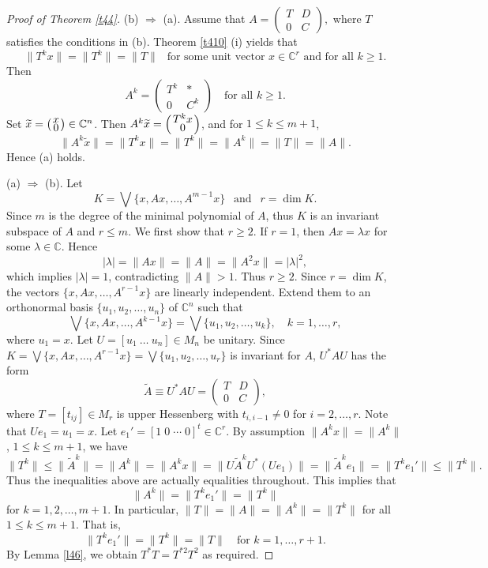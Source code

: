 \documentclass[11pt]{article}
\numberwithin{equation}{section}
\def\IC{{\mathbb C}}
\begin{document}
\begin{proof}[Proof of Theorem \ref{t44}]
(b) $\Rightarrow$ (a).
Assume that
$
A = \begin{pmatrix}
T & D\\
0 & C
\end{pmatrix},
$
where $T$ satisfies the conditions in (b). Theorem \ref{t410} (i) yields that
\[
\|T^kx\|=\|T^k\|=\|T\| \ \ \mbox{ for some unit vector } x\in\IC^r \mbox{ and for all } k\ge 1.
\]
Then
\begin{equation}\label{eq48}
A^k = \begin{pmatrix}
T^k & *\\
0 & C^k
\end{pmatrix}
\quad \text{for all } k\ge 1.
\end{equation}
Set $\widetilde{x} =\left({\textstyle x\atop  \textstyle 0}\right) \in \mathbb{C}^n$. Then $A^k \widetilde{x} = \Big({\textstyle T^kx\atop  \textstyle 0}\Big)$, and for $1 \le k \le m+1$,
\[
\|A^k \widetilde{x}\| = \|T^k x\| = \|T^k\|  = \|A^k\| = \|T\|= \|A\|.
\]
Hence (a) holds.

\medskip

(a) $\Rightarrow$ (b).
Let
\[
K=\bigvee \{x, Ax, \ldots, A^{m-1}x\}\ \ \mbox{ and }  \ \ r = \dim K.
\]
Since $m$ is the degree of the minimal polynomial of $A$, thus $K$ is an invariant subspace of $A$ and $r\le m$. We first show that $r \ge 2$.
If $r=1$, then $Ax = \lambda x$ for some $\lambda\in \mathbb{C}$.
Hence
\[
|\lambda| = \|Ax\| = \|A\| = \|A^2 x\| = |\lambda|^2,
\]
which implies $|\lambda| = 1$, contradicting $\|A\| > 1$.
Thus $r \ge 2$. Since $r=\dim K$,
the vectors $\{x, Ax, \ldots, A^{r-1}x\}$ are linearly independent.
Extend them to an orthonormal basis $\{u_1, u_2, \ldots, u_n\}$ of $\mathbb{C}^n$ such that
\[
\bigvee \{x, Ax, \ldots, A^{k-1}x\}
= \bigvee \{u_1, u_2, \ldots, u_k\}, \quad k=1,\ldots,r,
\]
where $u_1 = x$. Let $U=[u_1 \ \dots \ u_n]\in M_n$ be unitary. Since $K=\bigvee \{x, Ax, \ldots, A^{r-1}x\}=\bigvee \{u_1, u_2, \ldots, u_r\}$ is invariant for $A$, $U^*AU$ has the form
\[
\widetilde{A}\equiv U^*AU = \begin{pmatrix}
T & D\\
0 & C
\end{pmatrix},
\]
where $T=[t_{ij}]\in M_r$ is upper Hessenberg with $t_{i,i-1}\ne 0$ for $i=2,\ldots,r$.
Note that $Ue_1=u_1=x$. Let $e_1' = [1\;0\;\cdots\;0]^t \in \mathbb{C}^r$.
By assumption $\|A^kx\| =\|A^k\|$, $1\le k\le m+1$, we have
\[
\|T^k\| \le  \|\widetilde{A}^k\|=\|A^k\| =\|A^k x\|=\|U\widetilde{A}^kU^*(Ue_1)\|=
\|\widetilde{A}^k e_1\| = \|T^k e_1'\| \le \|T^k\|.
\]
Thus the inequalities above are actually equalities throughout. This implies that
\[
\|A^k\| = \|T^k e_1'\| = \|T^k\|
\]
for $k=1,2,\ldots,m+1$. In particular, $\|T\|=\|A\|=\|A^k\|=\|T^k\|$ for all $1\le k\le m+1$.
That is,
\[
\|T^k e_1'\| = \|T^k\| = \|T\| \quad \text{for } k=1,\ldots,r+1.
\]
By Lemma \ref{l46}, we obtain $T^*T = T^{*2}T^2$
as required.


\end{proof}
\end{document}
